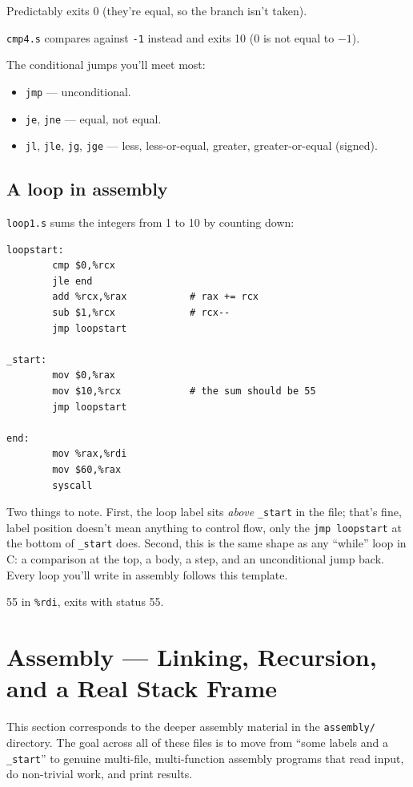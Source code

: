 \documentclass[11pt]{article}
\begin{document}
Predictably exits 0 (they're equal, so the branch isn't taken).

\texttt{cmp4.s} compares against \texttt{-1} instead and exits 10
(0 is not equal to $-1$).

The conditional jumps you'll meet most:
\begin{itemize}
  \item \texttt{jmp} --- unconditional.
  \item \texttt{je}, \texttt{jne} --- equal, not equal.
  \item \texttt{jl}, \texttt{jle}, \texttt{jg}, \texttt{jge} --- less,
    less-or-equal, greater, greater-or-equal (signed).
\end{itemize}

\subsection*{A loop in assembly}

\texttt{loop1.s} sums the integers from 1 to 10 by counting down:

\begin{lstlisting}
loopstart:
        cmp $0,%rcx
        jle end
        add %rcx,%rax           # rax += rcx
        sub $1,%rcx             # rcx--
        jmp loopstart

_start:
        mov $0,%rax
        mov $10,%rcx            # the sum should be 55
        jmp loopstart

end:
        mov %rax,%rdi
        mov $60,%rax
        syscall
\end{lstlisting}

Two things to note. First, the loop label sits \emph{above}
\texttt{\_start} in the file; that's fine, label position doesn't
mean anything to control flow, only the \texttt{jmp loopstart} at the
bottom of \texttt{\_start} does. Second, this is the same shape as
any ``while'' loop in C: a comparison at the top, a body, a step, and
an unconditional jump back. Every loop you'll write in assembly
follows this template.

55 in \texttt{\%rdi}, exits with status 55.

\section{Assembly --- Linking, Recursion, and a Real Stack Frame}

This section corresponds to the deeper assembly material in the
\texttt{assembly/} directory. The goal across all of these files is to
move from ``some labels and a \texttt{\_start}'' to genuine
multi-file, multi-function assembly programs that read input, do
non-trivial work, and print results.
\end{document}
